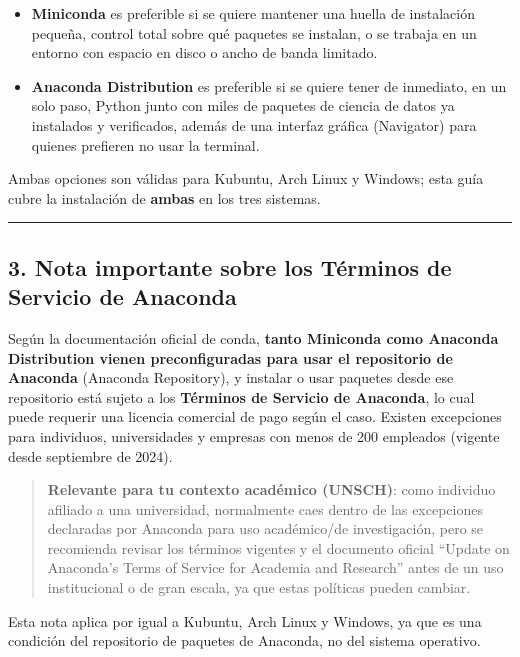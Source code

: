\documentclass[
  doc,
  floatsintext,
  longtable,
  a4paper,
  nolmodern,
  notxfonts,
  notimes,
  12pt,
  colorlinks=true,linkcolor=blue,citecolor=blue,urlcolor=blue]{apa7}
\providecommand{\tightlist}{%
  \setlength{\itemsep}{0pt}\setlength{\parskip}{0pt}}
\begin{document}
\begin{itemize}
\tightlist
\item
  \textbf{Miniconda} es preferible si se quiere mantener una huella de
  instalación pequeña, control total sobre qué paquetes se instalan, o
  se trabaja en un entorno con espacio en disco o ancho de banda
  limitado.
\item
  \textbf{Anaconda Distribution} es preferible si se quiere tener de
  inmediato, en un solo paso, Python junto con miles de paquetes de
  ciencia de datos ya instalados y verificados, además de una interfaz
  gráfica (Navigator) para quienes prefieren no usar la terminal.
\end{itemize}

Ambas opciones son válidas para Kubuntu, Arch Linux y Windows; esta guía
cubre la instalación de \textbf{ambas} en los tres sistemas.

\begin{center}\rule{0.5\linewidth}{0.5pt}\end{center}

\subsection{3. Nota importante sobre los Términos de Servicio de
Anaconda}\label{nota-importante-sobre-los-tuxe9rminos-de-servicio-de-anaconda}

Según la documentación oficial de conda, \textbf{tanto Miniconda como
Anaconda Distribution vienen preconfiguradas para usar el repositorio de
Anaconda} (Anaconda Repository), y instalar o usar paquetes desde ese
repositorio está sujeto a los \textbf{Términos de Servicio de Anaconda},
lo cual puede requerir una licencia comercial de pago según el caso.
Existen excepciones para individuos, universidades y empresas con menos
de 200 empleados (vigente desde septiembre de 2024).

\begin{quote}
\textbf{Relevante para tu contexto académico (UNSCH)}: como individuo
afiliado a una universidad, normalmente caes dentro de las excepciones
declaradas por Anaconda para uso académico/de investigación, pero se
recomienda revisar los términos vigentes y el documento oficial ``Update
on Anaconda's Terms of Service for Academia and Research'' antes de un
uso institucional o de gran escala, ya que estas políticas pueden
cambiar.
\end{quote}

Esta nota aplica por igual a Kubuntu, Arch Linux y Windows, ya que es
una condición del repositorio de paquetes de Anaconda, no del sistema
operativo.
\end{document}
